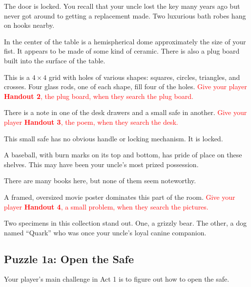 \documentclass[a6paper, parskip=half, DIV=14, 12pt]{scrartcl}
\begin{document}
\begin{description}[leftmargin=0pt]
\item[Door (E)] The door is locked. You recall that your uncle lost the key many years ago but never got around to getting a replacement made. Two luxurious bath robes hang on hooks nearby.%
\item[Table (C)] In the center of the table is a hemispherical dome approximately the size of your fist. It appears to be made of some kind of ceramic.
There is also a plug board built into the surface of the table.
\item[Plug Board (C)] This is a $4 \times 4$ grid with holes of various shapes: squares, circles, triangles, and crosses. Four glass rods, one of each shape, fill four of the holes. \textcolor{Red}{Give your player \textbf{Handout 2}, the plug board, when they search the plug board.}
\item[Desk (W)] There is a note in one of the desk drawers and a small safe in another. \textcolor{Red}{Give your player \textbf{Handout 3}, the poem, when they search the desk.}
\item[Safe (W)] This small safe has no obvious handle or locking mechanism. It is locked.
\item[Shelves (NW)] A baseball, with burn marks on its top and bottom, has pride of place on these shelves. This may have been your uncle's most prized possession.
\item[Bookcases (NE)] There are many books here, but none of them seem noteworthy.
\item[Pictures (SE)] A framed, oversized movie poster dominates this part of the room. \textcolor{Red}{Give your player \textbf{Handout 4}, a small problem, when they search the pictures.}
\item[Animals (SW)] Two specimens in this collection stand out. One, a grizzly bear. The other, a dog named ``Quark'' who was once your uncle's loyal canine companion.
\end{description}

\subsection*{Puzzle 1a: Open the Safe}
Your player's main challenge in Act 1 is to figure out how to open the safe.
\end{document}
